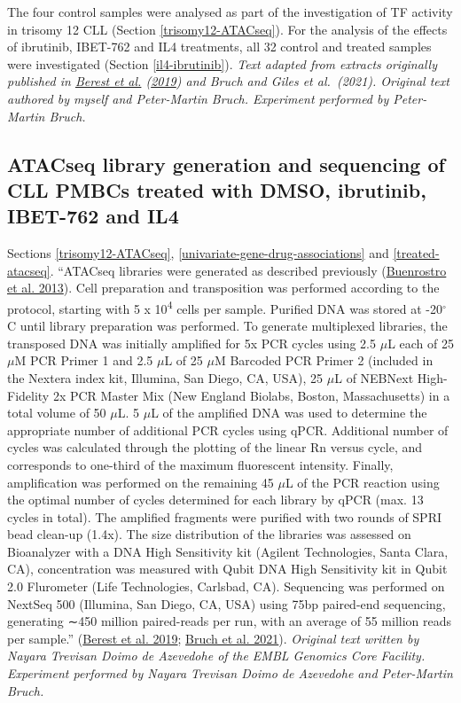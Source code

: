 \documentclass[11pt, a4paper, twosided]{book}
\begin{document}
The four control samples were analysed as part of the investigation of TF activity in trisomy 12 CLL (Section \ref{trisomy12-ATACseq}). For the analysis of the effects of ibrutinib, IBET-762 and IL4 treatments, all 32 control and treated samples were investigated (Section \ref{il4-ibrutinib}). \emph{Text adapted from extracts originally published in \protect\hyperlink{ref-Berest2019}{Berest et al.} (\protect\hyperlink{ref-Berest2019}{2019}) and Bruch and Giles et al.~(2021). Original text authored by myself and Peter-Martin Bruch. Experiment performed by Peter-Martin Bruch.}

\hypertarget{treated-ATACseq-method}{%
\subsection{ATACseq library generation and sequencing of CLL PMBCs treated with DMSO, ibrutinib, IBET-762 and IL4}\label{treated-ATACseq-method}}

Sections \ref{trisomy12-ATACseq}, \ref{univariate-gene-drug-associations} and \ref{treated-atacseq}. ``ATACseq libraries were generated as described previously (\protect\hyperlink{ref-Buenrostro2013}{Buenrostro et al. 2013}). Cell preparation and transposition was performed according to the protocol, starting with 5 x 10\textsuperscript{4} cells per sample. Purified DNA was stored at -20\(^\circ\)C until library preparation was performed. To generate multiplexed libraries, the transposed DNA was initially amplified for 5x PCR cycles using 2.5 \(\mu\)L each of 25 \(\mu\)M PCR Primer 1 and 2.5 \(\mu\)L of 25 \(\mu\)M Barcoded PCR Primer 2 (included in the Nextera index kit, Illumina, San Diego, CA, USA), 25 \(\mu\)L of NEBNext High-Fidelity 2x PCR Master Mix (New England Biolabs, Boston, Massachusetts) in a total volume of 50 \(\mu\)L. 5 \(\mu\)L of the amplified DNA was used to determine the appropriate number of additional PCR cycles using qPCR. Additional number of cycles was calculated through the plotting of the linear Rn versus cycle, and corresponds to one-third of the maximum fluorescent intensity. Finally, amplification was performed on the remaining 45 \(\mu\)L of the PCR reaction using the optimal number of cycles determined for each library by qPCR (max. 13 cycles in total). The amplified fragments were purified with two rounds of SPRI bead clean-up (1.4x). The size distribution of the libraries was assessed on Bioanalyzer with a DNA High Sensitivity kit (Agilent Technologies, Santa Clara, CA), concentration was measured with Qubit DNA High Sensitivity kit in Qubit 2.0 Flurometer (Life Technologies, Carlsbad, CA). Sequencing was performed on NextSeq 500 (Illumina, San Diego, CA, USA) using 75bp paired-end sequencing, generating ∼450 million paired-reads per run, with an average of 55 million reads per sample.'' (\protect\hyperlink{ref-Berest2019}{Berest et al. 2019}; \protect\hyperlink{ref-Giles2021}{Bruch et al. 2021}). \emph{Original text written by Nayara Trevisan Doimo de Azevedohe of the EMBL Genomics Core Facility. Experiment performed by Nayara Trevisan Doimo de Azevedohe and Peter-Martin Bruch.}
\end{document}
